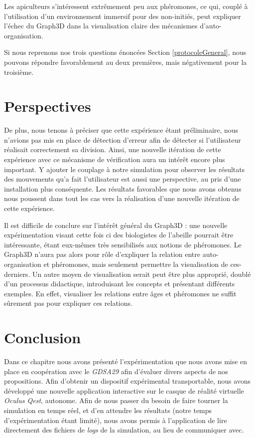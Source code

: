 Les apiculteurs s'intéressent extrêmement peu aux phéromones, ce qui, couplé à l'utilisation d'un environnement immersif pour des non-initiés, peut expliquer l'échec du Graph3D dans la visualisation claire des mécanismes d'auto-organisation.

	Si nous reprenons nos trois questions énoncées Section \ref{protocoleGeneral}, nous pouvons répondre favorablement au deux premières, mais négativement pour la troisième.

	
	\section{Perspectives}
 	De plus, nous tenons à préciser que cette expérience étant préliminaire, nous n'avions pas mis en place de détection d'erreur afin de détecter si l'utilisateur réalisait correctement sa division. Ainsi, une nouvelle itération de cette expérience avec ce mécanisme de vérification aura un intérêt encore plus important. Y ajouter le couplage à notre simulation pour observer les résultats des mouvements qu'a fait l'utilisateur est aussi une perspective, au pris d'une installation plus conséquente. Les résultats favorables que nous avons obtenus nous poussent dans tout les cas vers la réalisation d'une nouvelle itération de cette expérience.

Il est difficile de conclure sur l'intérêt général du Graph3D : une nouvelle expérimentation visant cette fois ci des biologistes de l'abeille pourrait être intéressante, étant eux-mêmes très sensibilisés aux notions de phéromones. Le Graph3D n'aura pas alors pour rôle d'expliquer la relation entre auto-organisation et phéromones, mais seulement permettre la visualisation de ces-derniers. Un autre moyen de visualisation serait peut être plus approprié, doublé d'un processus didactique, introduisant les concepts et présentant différents exemples. En effet, visualiser les relations entre âges et phéromones ne suffit sûrement pas pour expliquer ces relations.
			
	\section*{Conclusion}
	Dans ce chapitre nous avons présenté l'expérimentation que nous avons mise en place en coopération avec le \textit{GDSA29} afin d'évaluer divers aspects de nos propositions. Afin d'obtenir un dispositif expérimental transportable, nous avons développé une nouvelle application interactive sur le casque de réalité virtuelle \textit{Oculus Qest}, autonome. Afin de nous passer du besoin de faire tourner la simulation en temps réel, et d'en attendre les résultats (notre temps d'expérimentation étant limité), nous avons permis à l'application de lire directement des fichiers de \textit{logs} de la simulation, au lieu de communiquer avec.
	
